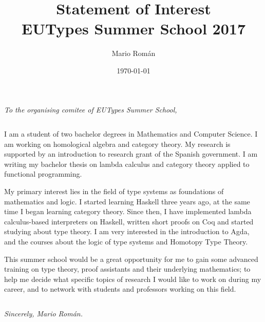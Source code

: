 \documentclass[11pt]{article}
\author{Mario Román}
\date{\today}
\title{Statement of Interest\\\medskip
\large EUTypes Summer School 2017}
\begin{document}
\maketitle
\emph{To the organising comitee of EUTypes Summer School,}

\(\quad\)

I am a student of two bachelor degrees in Mathematics and Computer
Science. I am working on homological algebra and category theory. My
research is supported by an introduction to research grant of the
Spanish government. I am writing my bachelor thesis on lambda calculus
and category theory applied to functional programming.

My primary interest lies in the field of type systems as foundations
of mathematics and logic. I started learning Haskell three years
ago, at the same time I began learning category theory. Since
then, I have implemented lambda calculus-based interpreters on
Haskell, written short proofs on Coq and started studying about type
theory. I am very interested in the introduction to Agda, and the
courses about the logic of type systems and Homotopy Type Theory.

This summer school would be a great opportunity for me to gain some
advanced training on type theory, proof assistants and their
underlying mathematics; to help me decide what specific topics of
research I would like to work on during my career, and to network with students
and professors working on this field.

\(\quad\)

\emph{Sincerely, Mario Román.}
\end{document}
